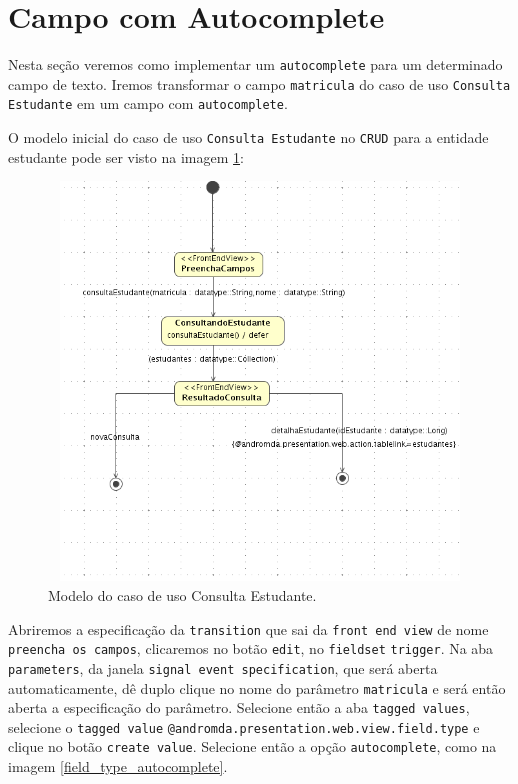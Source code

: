 \section{Campo com Autocomplete}

Nesta seção veremos como implementar um \texttt{autocomplete} para um
determinado campo de texto. Iremos transformar o campo \texttt{matricula} do
caso de uso \texttt{Consulta Estudante} em um campo com \texttt{autocomplete}.

O modelo inicial do caso de uso \texttt{Consulta Estudante} no  \texttt{CRUD}
para a entidade estudante pode ser visto na imagem \ref{modelo_consulta_estudante}:

\begin{figure}[H]
	\centering
	\includegraphics[width=350pt,height=300pt]{files/imgs/tutorial-mdarte-0028.png}
	\caption{Modelo do caso de uso Consulta Estudante.}
	\label{modelo_consulta_estudante}
\end{figure}

Abriremos a especificação da \texttt{transition} que sai da \texttt{front end
view} de nome \texttt{preencha os campos}, clicaremos no botão \texttt{edit}, no
\texttt{fieldset} \texttt{trigger}. Na aba \texttt{parameters}, da janela
\texttt{signal event specification}, que será aberta automaticamente, dê duplo
clique no nome do parâmetro \texttt{matricula} e será então aberta a
especificação do parâmetro. Selecione então a aba \texttt{tagged values},
selecione o \texttt{tagged value}
\texttt{@andromda.presentation.web.view.field.type} e clique no botão
\texttt{create value}. Selecione então a opção \texttt{autocomplete}, como na
imagem \ref{field_type_autocomplete}.

